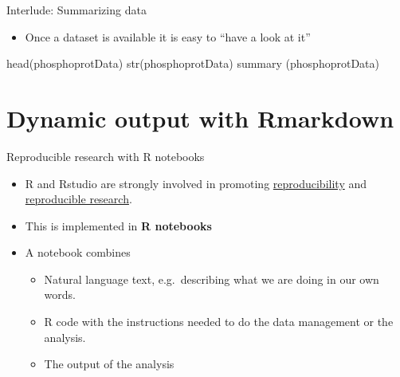 \documentclass[
  ignorenonframetext,
]{beamer}
\newenvironment{Shaded}{\begin{snugshade}}{\end{snugshade}}
\newcommand{\FunctionTok}[1]{\textcolor[rgb]{0.00,0.00,0.00}{#1}}
\newcommand{\NormalTok}[1]{#1}
\providecommand{\tightlist}{%
  \setlength{\itemsep}{0pt}\setlength{\parskip}{0pt}}
\begin{document}
\begin{frame}[fragile]{Interlude: Summarizing data}
\protect\hypertarget{interlude-summarizing-data}{}
\begin{itemize}
\tightlist
\item
  Once a dataset is available it is easy to ``have a look at it''
\end{itemize}

\begin{Shaded}
\begin{Highlighting}[]
\FunctionTok{head}\NormalTok{(phosphoprotData)}
\FunctionTok{str}\NormalTok{(phosphoprotData)}
\FunctionTok{summary}\NormalTok{ (phosphoprotData)}
\end{Highlighting}
\end{Shaded}
\end{frame}

\hypertarget{dynamic-output-with-rmarkdown}{%
\section{Dynamic output with
Rmarkdown}\label{dynamic-output-with-rmarkdown}}

\begin{frame}{Reproducible research with R notebooks}
\protect\hypertarget{reproducible-research-with-r-notebooks}{}
\begin{itemize}
\tightlist
\item
  R and Rstudio are strongly involved in promoting
  \href{https://en.wikipedia.org/wiki/Reproducibility}{reproducibility}
  and
  \href{https://en.wikipedia.org/wiki/Reproducibility\#Reproducible_research}{reproducible
  research}.
\item
  This is implemented in \textbf{R notebooks}
\item
  A notebook combines

  \begin{itemize}
  \tightlist
  \item
    Natural language text, e.g.~describing what we are doing in our own
    words.
  \item
    R code with the instructions needed to do the data management or the
    analysis.
  \item
    The output of the analysis
  \end{itemize}
\end{itemize}
\end{frame}
\end{document}
